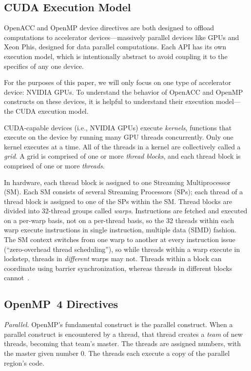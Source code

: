 \documentclass{sig-alternate-05-2015}
\begin{document}
\subsection{CUDA Execution Model}

OpenACC and OpenMP device directives are both designed to offload computations
to accelerator devices---massively parallel devices like GPUs and Xeon Phis,
designed for data parallel computations.  Each API has its own execution model,
which is intentionally abstract to avoid coupling it to the specifics of any
one device.

For the purposes of this paper, we will only focus on one type of accelerator
device: NVIDIA GPUs.  To understand the behavior of OpenACC and OpenMP
constructs on these devices, it is helpful to understand their execution
model---the CUDA execution model.

CUDA-capable devices (i.e., NVIDIA GPUs) execute \emph{kernels}, functions that
execute on the device by running many GPU threads concurrently. Only one kernel
executes at a time. All of the threads in a kernel are collectively called a
\emph{grid}. A grid is comprised of one or more \emph{thread blocks}, and each
thread block is comprised of one or more \emph{threads}.

In hardware, each thread block is assigned to one Streaming Multiprocessor
(SM). Each SM consists of several Streaming Processors (SPs); each thread of a
thread block is assigned to one of the SPs within the SM.  Thread blocks are
divided into 32-thread groups called \emph{warps}.  Instructions are fetched
and executed on a per-warp basis, not on a per-thread basis, so the 32 threads
within each warp execute instructions in single instruction, multiple data
(SIMD) fashion.  The SM context switches from one warp to another at every
instruction issue (``zero-overhead thread scheduling''), so while threads
within a warp execute in lockstep, threads in \emph{different} warps may not.
Threads within a block can coordinate using barrier synchronization, whereas
threads in different blocks cannot~\cite{kirk2012programming}.

\subsection{OpenMP~4 Directives}

\emph{Parallel.}
OpenMP's fundamental construct is the parallel construct. When a parallel
construct is encountered by a thread, that thread creates a \emph{team} of new
threads, becoming that team's master. The threads are assigned numbers, with
the master given number 0. The threads each execute a copy of the parallel
region's code. %
\end{document}
